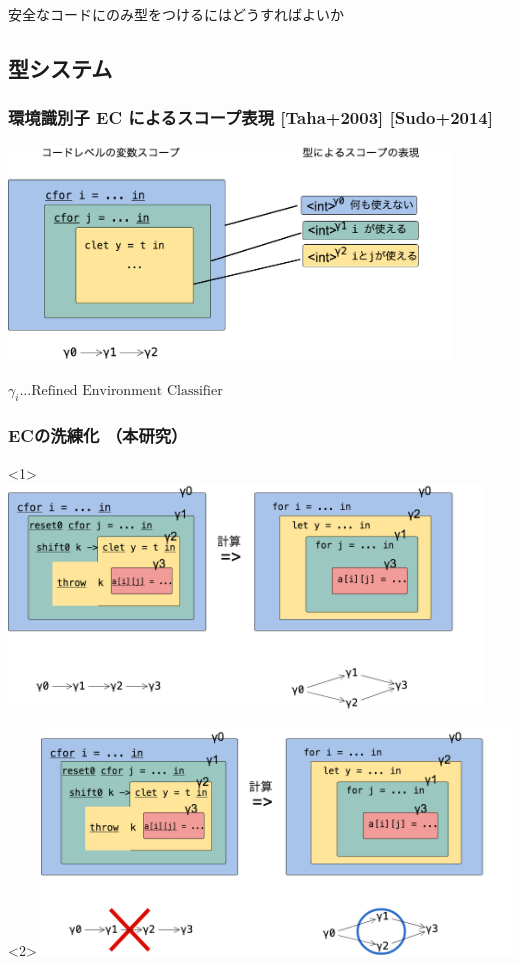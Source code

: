 \begin{frame}
  \center
  \huge{安全なコードにのみ型をつけるにはどうすればよいか}
\end{frame}

\subsection{型システム}

\begin{frame}
  \frametitle{環境識別子 EC によるスコープ表現 [Taha+2003] [Sudo+2014]}
  \begin{center}
    \includegraphics[clip,height=5.7cm]{./img/ec.png}
  \end{center}
  \begin{flushright}
    $\gamma_i ... \text{Refined Environment Classifier}$
  \end{flushright}
\end{frame}

\begin{frame}
  \frametitle{ECの洗練化 （本研究）}
  \begin{onlyenv}<1>
    \flushleft
    \includegraphics[clip,height=6cm]{./img/ecex1.png}
  \end{onlyenv}

  \begin{onlyenv}<2>
    \flushleft
    \includegraphics[clip,height=6cm]{./img/ecex.png}
  \end{onlyenv}
\end{frame}

